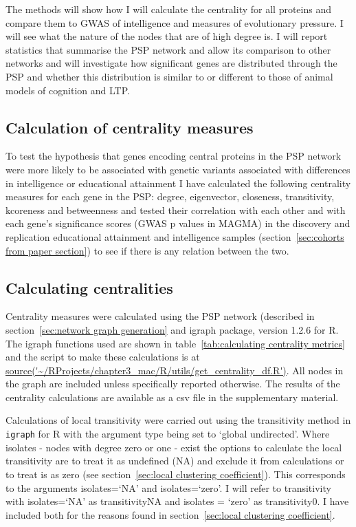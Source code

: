   The methods will show how I will calculate the centrality for all proteins and compare them to GWAS of intelligence and measures of evolutionary pressure. I will see what the nature of the nodes that are of high degree is. I will report statistics that summarise the PSP network and allow its comparison to other networks and will investigate how significant genes are distributed through the PSP and whether this distribution is similar to or different to those of animal models of cognition and LTP. 
    \subsection{Calculation of centrality measures}

To test the hypothesis that  genes encoding central proteins in the  PSP network were more likely to be associated with genetic variants associated with differences in intelligence or educational attainment I have calculated the following centrality measures for each gene in the PSP: degree, eigenvector, closeness, transitivity, kcoreness and betweenness and tested their correlation with each other and with each gene's significance scores (GWAS p values in MAGMA) in the discovery and replication educational attainment and intelligence samples (section~\ref{sec:cohorts from paper section}) to see if there is any relation between the two. 


\subsection{Calculating centralities}
\label{sec:calculating centralities}
Centrality measures were calculated using the PSP network (described in section~\ref{sec:network graph generation} and igraph package, version 1.2.6 for R. The igraph functions used are shown in table~\ref{tab:calculating centrality metrics} and the script to make these calculations is at \url{source('~/RProjects/chapter3_mac/R/utils/get_centrality_df.R')}. All nodes in the graph are included unless specifically reported otherwise. The results of the centrality calculations are available as a csv file in the supplementary material.

Calculations of local transitivity were carried out using the transitivity method in \texttt{igraph} for R with the argument type being set to `global undirected'. Where isolates - nodes with degree zero or one - exist the options to calculate the local transitivity are to treat it as undefined (NA) and exclude it from calculations or to treat is as zero (see section~\ref{sec:local clustering coefficient}). This corresponds to the arguments isolates=`NA' and isolates=`zero'. I will refer to transitivity with isolates=`NA' as transitivityNA and isolates = `zero' as transitivity0. I have included both for the reasons found in section~\ref{sec:local clustering coefficient}\cite{schank2005approximating}.

